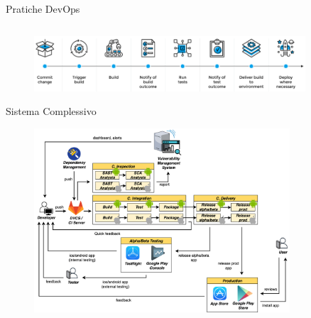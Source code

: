 \begin{frame}{Pratiche DevOps}
\begin{columns}[onlytextwidth]
\begin{column}{0.45\textwidth}
        \end{column}
    \end{columns}

    \vspace{2mm}

    \begin{figure}[H]
        \includegraphics[width=0.9\textwidth]{img/cicd.png}
    \end{figure}
    
\end{frame}

\begin{frame}{Sistema Complessivo}

    \begin{figure}[H]
        \includegraphics[width=0.85\textwidth]{img/full-cicd.png}
    \end{figure}

\end{frame}